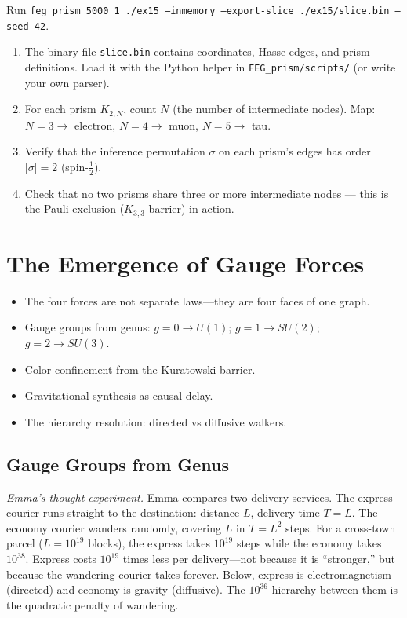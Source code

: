 \documentclass[11pt, a4paper, openany]{book}
\newenvironment{introduction}[1][Modulo Overview]{%
  \begin{tcolorbox}[
    enhanced,colback=structure!5,colframe=structure,
    colbacktitle=structure,coltitle=white,
    fonttitle=\small\bfseries,title={#1},
    arc=2pt,boxrule=0.7pt,
    left=8pt,right=8pt,top=6pt,bottom=6pt,
    before skip=12pt,after skip=12pt
  ]\itshape\begin{itemize}[leftmargin=*,itemsep=2pt,parsep=0pt]
}{%
  \end{itemize}\end{tcolorbox}
}
\begin{document}
\begin{simulation}
Run \texttt{feg\_prism 5000 1 ./ex15 --inmemory --export-slice ./ex15/slice.bin --seed 42}.
\begin{enumerate}
\item The binary file \texttt{slice.bin} contains coordinates, Hasse edges, and prism definitions. Load it with the Python helper in \texttt{FEG\_prism/scripts/} (or write your own parser).
\item For each prism $K_{2,N}$, count $N$ (the number of intermediate nodes). Map: $N = 3 \to$ electron, $N = 4 \to$ muon, $N = 5 \to$ tau.
\item Verify that the inference permutation $\sigma$ on each prism's edges has order $|\sigma| = 2$ (spin-$\tfrac{1}{2}$).
\item Check that no two prisms share three or more intermediate nodes --- this is the Pauli exclusion ($K_{3,3}$ barrier) in action.
\end{enumerate}
\end{simulation}


\chapter{The Emergence of Gauge Forces}\label{ch:gauge}

\begin{introduction}
  \item The four forces are not separate laws---they are four faces of one graph.
  \item Gauge groups from genus: $g=0 \to U(1)$; $g=1 \to SU(2)$; $g=2 \to SU(3)$.
  \item Color confinement from the Kuratowski barrier.
  \item Gravitational synthesis as causal delay.
  \item The hierarchy resolution: directed vs diffusive walkers.
\end{introduction}

\section{Gauge Groups from Genus}

\smallskip\noindent
\textit{Emma's thought experiment.}
Emma compares two delivery services. The express courier runs straight to
the destination: distance $L$, delivery time $T = L$. The economy
courier wanders randomly, covering $L$ in $T = L^2$ steps. For a
cross-town parcel ($L = 10^{19}$ blocks), the express takes
$10^{19}$ steps while the economy takes $10^{38}$. Express costs
$10^{19}$ times less per delivery---not because it is ``stronger,'' but
because the wandering courier takes forever. Below, express is
electromagnetism (directed) and economy is gravity (diffusive). The
$10^{36}$ hierarchy between them is the quadratic penalty of wandering.
\smallskip
\end{document}
